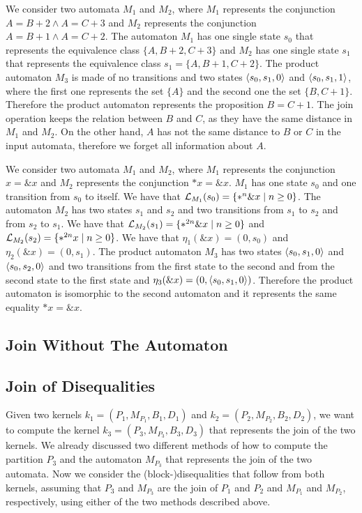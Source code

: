 
\begin{example}
    We consider two automata $M_1$ and $M_2$, where $M_1$ represents the conjunction $A = B + 2 \land A = C + 3$ and $M_2$ represents the conjunction $A = B + 1 \land A = C + 2$.
    The automaton $M_1$ has one single state $s_0$ that represents the equivalence class $\{A, B+2, C+3\}$
    and $M_2$ has one single state $s_1$ that represents the equivalence class $s_1 = \{A, B+1, C+2\}$.
    The product automaton $M_3$ is made of no transitions and two states $\langle s_0, s_1, 0\rangle$ and $\langle s_0, s_1, 1\rangle$, where the first one represents the set $\{A\}$ and the second one the set $\{B, C+1\}$.
    Therefore the product automaton represents the proposition $B = C + 1$.
    The join operation keeps the relation between $B$ and $C$, as they have the same distance in $M_1$ and $M_2$.
    On the other hand, $A$ has not the same distance to $B$ or $C$ in the input automata, therefore we forget all information about $A$.
\end{example}

\begin{example}\label{example:join-subset}
    We consider two automata $M_1$ and $M_2$, where $M_1$ represents the conjunction $x = \&x$ and $M_2$ represents the conjunction $*x = \&x$.
    $M_1$ has one state $s_0$ and one transition from $s_0$ to itself. We have that $\mathcal{L}_{M_1}(s_0) =\{*^n\&x\mid n \geq 0\}$.
    The automaton $M_2$ has two states $s_1$ and $s_2$ and two transitions from $s_1$ to $s_2$ and from $s_2$ to $s_1$. We have that $\mathcal{L}_{M_2}(s_1) = \{*^{2n}\&x\mid n \geq 0\}$ and $\mathcal{L}_{M_2}(s_2) = \{*^{2n}x\mid n \geq 0\}$.
    We have that $\eta_1(\&x) = (0, s_0)$ and $\eta_2 (\&x) = (0, s_1)$.
    The product automaton $M_3$ has two states $\langle s_0, s_1, 0\rangle$ and $\langle s_0, s_2, 0\rangle$ and two transitions from the first state to the second and from the second state to the first state and $\eta_3(\&x) = (0, \langle s_0, s_1, 0\rangle)$.
    Therefore the product automaton is isomorphic to the second automaton and it represents the same equality $*x = \&x$.
\end{example}

\subsection{Join Without The Automaton}


\subsection{Join of Disequalities}
Given two kernels $k_1 = (P_1, M_{P_1},B_1, D_1)$ and $k_2 = (P_2, M_{P_2},B_2, D_2)$, we want to compute the kernel $k_3 = (P_3, M_{P_3},B_3, D_3)$ that represents the join of the two kernels.
We already discussed two different methods of how to compute the partition $P_3$ and the automaton $M_{P_3}$ that represents the join of the two automata.
Now we consider the (block-)disequalities that follow from both kernels,
assuming that $P_3$ and $M_{P_3}$ are the join of $P_1$ and $P_2$ and $M_{P_1}$ and $M_{P_2}$, respectively,
using either of the two methods described above.

